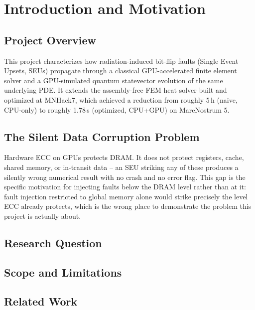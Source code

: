\chapter{Introduction and Motivation}
\label{ch:intro}

\section{Project Overview}
This project characterizes how radiation-induced bit-flip faults (Single Event Upsets, SEUs) propagate through a classical GPU-accelerated finite element solver and a GPU-simulated quantum statevector evolution of the same underlying PDE. It extends the assembly-free FEM heat solver built and optimized at MNHack7, which achieved a reduction from roughly 5\,h (naive, CPU-only) to roughly 1.78\,s (optimized, CPU+GPU) on MareNostrum 5.

\section{The Silent Data Corruption Problem}
Hardware ECC on GPUs protects DRAM. It does not protect registers, cache, shared memory, or in-transit data -- an SEU striking any of these produces a silently wrong numerical result with no crash and no error flag. This gap is the specific motivation for injecting faults below the DRAM level rather than at it: fault injection restricted to global memory alone would strike precisely the level ECC already protects, which is the wrong place to demonstrate the problem this project is actually about.

\section{Research Question}

\section{Scope and Limitations}

\section{Related Work}
\label{sec:related-work}

